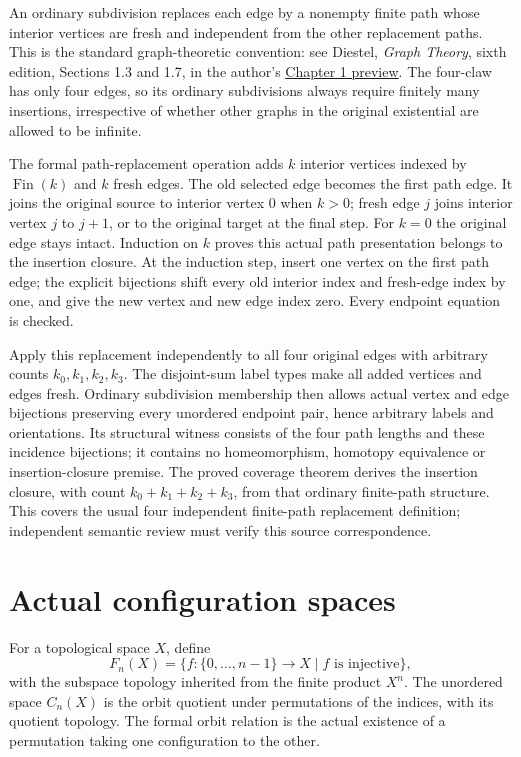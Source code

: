\documentclass[11pt]{article}
\begin{document}
An ordinary subdivision replaces each edge by a nonempty finite path whose
interior vertices are fresh and independent from the other replacement paths.
This is the standard graph-theoretic convention: see Diestel, \emph{Graph Theory},
sixth edition, Sections 1.3 and 1.7, in the author's
\href{https://www.math.uni-hamburg.de/home/diestel/books/graph.theory/preview/Ch1.pdf}
{Chapter 1 preview}.
The four-claw has only four edges, so its ordinary subdivisions always require
finitely many insertions, irrespective of whether other graphs in the original
existential are allowed to be infinite.

The formal path-replacement operation adds $k$ interior vertices indexed by
$\operatorname{Fin}(k)$ and $k$ fresh edges. The old selected edge becomes the
first path edge. It joins the original source to interior vertex $0$ when $k>0$;
fresh edge $j$ joins interior vertex $j$ to $j+1$, or to the original target
at the final step. For $k=0$ the original edge stays intact. Induction on $k$
proves this actual path presentation belongs to the insertion closure. At the
induction step, insert one vertex on the first path edge; the explicit bijections
shift every old interior index and fresh-edge index by one, and give the new
vertex and new edge index zero. Every endpoint equation is checked.

Apply this replacement independently to all four original edges with arbitrary
counts $k_0,k_1,k_2,k_3$. The disjoint-sum label types make all added vertices
and edges fresh. Ordinary subdivision membership then allows actual vertex and
edge bijections preserving every unordered endpoint pair, hence arbitrary labels
and orientations. Its structural witness consists of the four path lengths and
these incidence bijections; it contains no homeomorphism, homotopy equivalence
or insertion-closure premise. The proved coverage theorem derives the insertion
closure, with count $k_0+k_1+k_2+k_3$, from that ordinary finite-path structure.
This covers the usual four independent finite-path replacement definition;
independent semantic review must verify this source correspondence.

\section*{Actual configuration spaces}
For a topological space $X$, define
\[
 F_n(X)=\{f:\{0,\ldots,n-1\}\longrightarrow X\mid f\text{ is injective}\},
\]
with the subspace topology inherited from the finite product $X^n$.
The unordered space $C_n(X)$ is the orbit quotient under permutations of the
indices, with its quotient topology. The formal orbit relation is the actual
existence of a permutation taking one configuration to the other.
\end{document}
